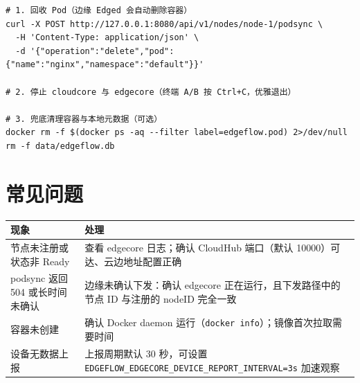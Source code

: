 \begin{lstlisting}
# 1. 回收 Pod（边缘 Edged 会自动删除容器）
curl -X POST http://127.0.0.1:8080/api/v1/nodes/node-1/podsync \
  -H 'Content-Type: application/json' \
  -d '{"operation":"delete","pod":{"name":"nginx","namespace":"default"}}'

# 2. 停止 cloudcore 与 edgecore（终端 A/B 按 Ctrl+C，优雅退出）

# 3. 兜底清理容器与本地元数据（可选）
docker rm -f $(docker ps -aq --filter label=edgeflow.pod) 2>/dev/null
rm -f data/edgeflow.db
\end{lstlisting}

\section{常见问题}

\begin{tabularx}{\textwidth}{|l|X|}
  \hline
  \textbf{现象} & \textbf{处理} \\
  \hline
  节点未注册或状态非 Ready & 查看 edgecore 日志；确认 CloudHub 端口（默认 10000）可达、云边地址配置正确 \\
  \hline
  podsync 返回 504 或长时间未确认 & 边缘未确认下发：确认 edgecore 正在运行，且下发路径中的节点 ID 与注册的 nodeID 完全一致 \\
  \hline
  容器未创建 & 确认 Docker daemon 运行（\texttt{docker info}）；镜像首次拉取需要时间 \\
  \hline
  设备无数据上报 & 上报周期默认 30 秒，可设置 \texttt{EDGEFLOW\_EDGECORE\_DEVICE\_REPORT\_INTERVAL=3s} 加速观察 \\
  \hline
\end{tabularx}
